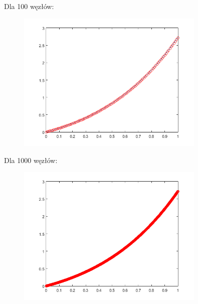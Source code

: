 \newpage
\begin{samepage}
	
	Dla 100 węzłów:
	\begin{figure}[!ht]
		\begin{center}
			\includegraphics[width=0.8\textwidth]{Lab4/charts/zad4/2/100.png}
		\end{center}
	\end{figure}
	\FloatBarrier
\end{samepage}

\begin{samepage}
	Dla 1000 węzłów:
	
	\begin{figure}[!ht]
		\begin{center}
			\includegraphics[width=0.8\textwidth]{Lab4/charts/zad4/2/1000.png}
		\end{center}
	\end{figure}
	\FloatBarrier
\end{samepage}    

